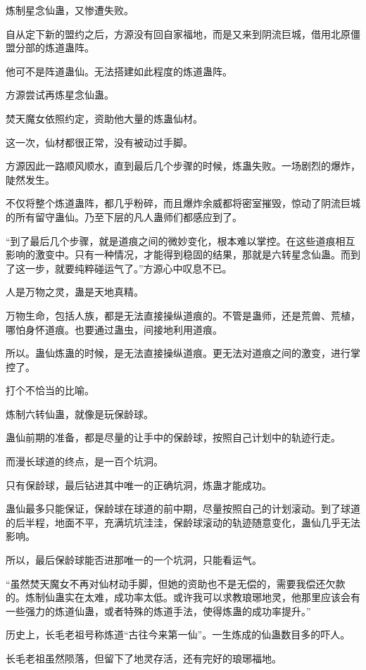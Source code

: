 \begin{this_body}
炼制星念仙蛊，又惨遭失败。

自从定下新的盟约之后，方源没有回自家福地，而是又来到阴流巨城，借用北原僵盟分部的炼道蛊阵。

他可不是阵道蛊仙。无法搭建如此程度的炼道蛊阵。

方源尝试再炼星念仙蛊。

焚天魔女依照约定，资助他大量的炼蛊仙材。

这一次，仙材都很正常，没有被动过手脚。

方源因此一路顺风顺水，直到最后几个步骤的时候，炼蛊失败。一场剧烈的爆炸，陡然发生。

不仅将整个炼道蛊阵，都几乎粉碎，而且爆炸余威都将密室摧毁，惊动了阴流巨城的所有留守蛊仙。乃至下层的凡人蛊师们都感应到了。

“到了最后几个步骤，就是道痕之间的微妙变化，根本难以掌控。在这些道痕相互影响的激变中。只有一种情况，才能得到稳固的结果，那就是六转星念仙蛊。而到了这一步，就要纯粹碰运气了。”方源心中叹息不已。

人是万物之灵，蛊是天地真精。

万物生命，包括人族，都是无法直接操纵道痕的。不管是蛊师，还是荒兽、荒植，哪怕身怀道痕。也要通过蛊虫，间接地利用道痕。

所以。蛊仙炼蛊的时候，是无法直接操纵道痕。更无法对道痕之间的激变，进行掌控了。

打个不恰当的比喻。

炼制六转仙蛊，就像是玩保龄球。

蛊仙前期的准备，都是尽量的让手中的保龄球，按照自己计划中的轨迹行走。

而漫长球道的终点，是一百个坑洞。

只有保龄球，最后钻进其中唯一的正确坑洞，炼蛊才能成功。

蛊仙最多只能保证，保龄球在球道的前中期，尽量按照自己的计划滚动。到了球道的后半程，地面不平，充满坑坑洼洼，保龄球滚动的轨迹随意变化，蛊仙几乎无法影响。

所以，最后保龄球能否进那唯一的一个坑洞，只能看运气。

“虽然焚天魔女不再对仙材动手脚，但她的资助也不是无偿的，需要我偿还欠款的。炼制仙蛊实在太难，成功率太低。或许我可以求教琅琊地灵，他那里应该会有一些强力的炼道仙蛊，或者特殊的炼道手法，使得炼蛊的成功率提升。”

历史上，长毛老祖号称炼道“古往今来第一仙”。一生炼成的仙蛊数目多的吓人。

长毛老祖虽然陨落，但留下了地灵存活，还有完好的琅琊福地。


\end{this_body}
